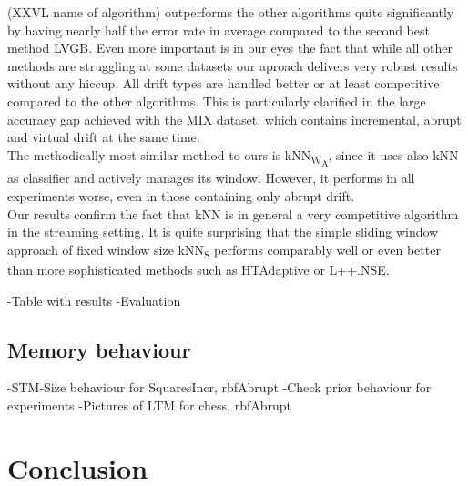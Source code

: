 \documentclass[conference]{IEEEtran}
\begin{document}
(XXVL name of algorithm) outperforms the other algorithms quite significantly by having nearly half the error rate in average compared to the second best method LVGB. 
Even more important is in our eyes the fact that while all other methods are struggling at some datasets our aproach delivers very robust results without any hiccup. All drift types are handled
better or at least competitive compared to the other algorithms. This is particularly clarified in the large accuracy gap achieved with the MIX dataset, which contains incremental, 
abrupt and virtual drift at the same time. \\
The methodically most similar method to ours is kNN\textsubscript{W\textsubscript{A}}, since it uses also kNN as classifier and actively manages its window.
However, it performs in all experiments worse, even in those containing only abrupt drift.\\
Our results confirm the fact that kNN is in general a very competitive algorithm in the streaming setting. It is quite surprising that the simple sliding window approach of fixed window size
kNN\textsubscript{S} performs comparably well or even better than more sophisticated methods such as HTAdaptive or L++.NSE.

-Table with results
-Evaluation
\subsection{Memory behaviour}
-STM-Size behaviour for SquaresIncr, rbfAbrupt
-Check prior behaviour for experiments
-Pictures of LTM for chess, rbfAbrupt


\section{Conclusion}

\newpage



%
%
%



\end{document}
